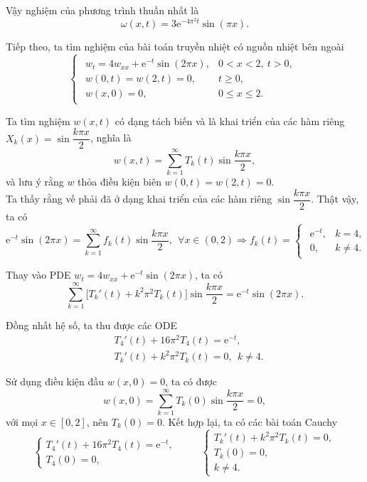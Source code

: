 \documentclass[10pt, a4paper]{article}
\begin{document}
	Vậy nghiệm của phương trình thuần nhất là $$\omega(x,t)=3\mathrm e^{-4\pi^2t}\sin(\pi x).$$
	
	Tiếp theo, ta tìm nghiệm của bài toán truyền nhiệt có nguồn nhiệt bên ngoài $$\begin{cases}
		\begin{array}{ll}
			w_t=4w_{xx}+\mathrm e^{-t}\sin(2\pi x), & 0<x<2,~t>0,\\
			w(0,t)=w(2,t)=0, & t\ge0,\\
			w(x,0)=0, & 0\le x\le 2.
		\end{array}
	\end{cases}$$
	
	Ta tìm nghiệm $w(x,t)$ có dạng tách biến và là khai triển của các hàm riêng $X_k(x)=\sin\dfrac{k\pi x}{2}$, nghĩa là $$w(x,t)=\sum_{k=1}^\infty T_k(t)\sin\frac{k\pi x}{2},$$
	và lưu ý rằng $w$ thỏa điều kiện biên $w(0,t)=w(2,t)=0$.\\
	
	Ta thấy rằng vế phải đã ở dạng khai triển của các hàm riêng $\sin\dfrac{k\pi x}{2}$. Thật vậy, ta có $$\mathrm e^{-t}\sin(2\pi x)=\sum_{k=1}^\infty f_k(t)\sin\frac{k\pi x}{2},~~\forall x\in(0,2)\Rightarrow f_k(t)=\begin{cases}
		\begin{array}{ll}
			\mathrm e^{-t}, & k=4, \\
			0, & k\ne4.
		\end{array}
	\end{cases}$$
	
	Thay vào PDE $w_t=4w_{xx}+\mathrm e^{-t}\sin(2\pi x)$, ta có $$\sum_{k=1}^\infty\big[T_k'(t)+k^2\pi^2T_k(t)\big]\sin\frac{k\pi x}{2}=\mathrm e^{-t}\sin(2\pi x).$$
	
	Đồng nhất hệ số, ta thu được các ODE \begin{align*}
		&T_4'(t)+16\pi^2T_4(t)=\mathrm e^{-t},\\
		&T_k'(t)+k^2\pi^2T_k(t)=0,~~k\ne4.
	\end{align*}
	
	Sử dụng điều kiện đầu $w(x,0)=0$, ta có được $$w(x,0)=\displaystyle\sum_{k=1}^\infty T_k(0)\sin\frac{k\pi x}{2}=0,$$
	với mọi $x\in[0,2]$, nên $T_k(0)=0$. Kết hợp lại, ta có các bài toán Cauchy $$\begin{cases}
		T_4'(t)+16\pi^2T_4(t)=\mathrm e^{-t},\\
		T_4(0)=0,
	\end{cases}\hspace{1cm}\begin{cases}
		T_k'(t)+k^2\pi^2T_k(t)=0,\\
		T_k(0)=0,\\
		k\ne4.
	\end{cases}$$
	
\end{document}
